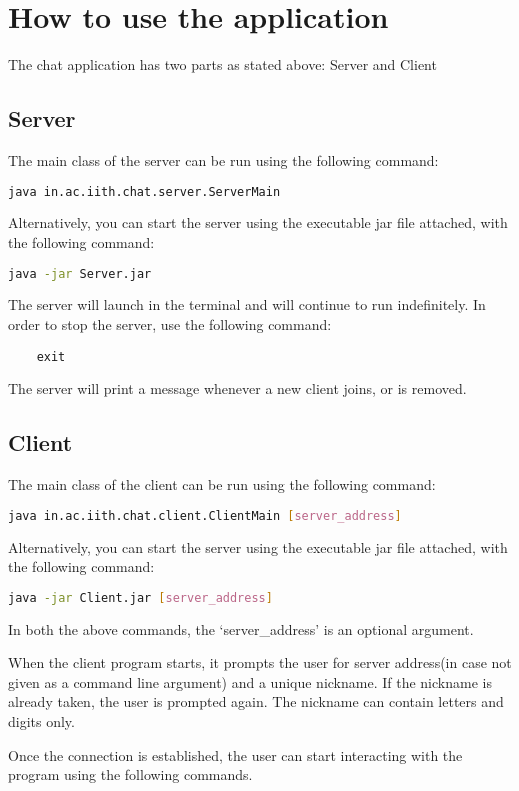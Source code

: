 \documentclass{article}
\begin{document}
	\newpage
	\section{How to use the application}
	The chat application has two parts as stated above: Server and Client
	
	\subsection{Server}
	The main class of the server can be run using the following command:
	\begin{lstlisting}[language=bash]
	java in.ac.iith.chat.server.ServerMain
	\end{lstlisting}
	Alternatively, you can start the server using the executable jar file attached, with the following command:
	\begin{lstlisting}[language=bash]
	java -jar Server.jar
	\end{lstlisting}
	The server will launch in the terminal and will continue to run indefinitely. In order to stop the server, use the following command:
	\begin{lstlisting}
	exit
	\end{lstlisting}
	The server will print a message whenever a new client joins, or is removed.


	\subsection{Client}
	The main class of the client can be run using the following command:
	\begin{lstlisting}[language=bash]
	java in.ac.iith.chat.client.ClientMain [server_address]
	\end{lstlisting}
	Alternatively, you can start the server using the executable jar file attached, with the following command:
	\begin{lstlisting}[language=bash]
	java -jar Client.jar [server_address]
	\end{lstlisting}
	In both the above commands, the `server\_address' is an optional argument.

	When the client program starts, it prompts the user for server address(in case not given as a command line argument) and a unique nickname. If the nickname is already taken, the user is prompted again. The nickname can contain letters and digits only.

	Once the connection is established, the user can start interacting with the program using the following commands.
\end{document}
